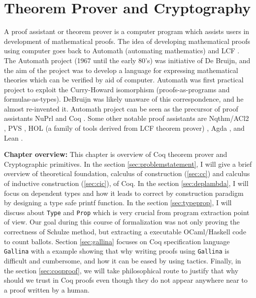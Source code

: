 \chapter{Theorem Prover and Cryptography}
\label{cha:theorem_crypto}
 

A proof assistant or theorem prover is a computer program which assists users in development 
of mathematical proofs. The idea of 
developing mathematical proofs using computer goes back to Automath (automating mathematics)
\citep{deBruijn1983} and LCF \citep{Milner:1972:IAS:942578.807067}. The 
Automath project (1967 until the early 80's)  was initiative of De Bruijn, and the aim of the project was to 
develop a language for expressing mathematical theories which can be verified by aid of computer.  
Automath was first 
practical project to exploit the Curry-Howard isomorphism (proofs-as-programs and formulas-as-types). 
DeBruijn  was likely unaware of this correspondence, and he almost re-invented it.
Automath project can be seen as the precursor of
 proof assistants NuPrl \citep{Constable:1986:IMN:10510} and Coq \citep{Bertot:2004:ITP}.  
 Some other notable  proof assistants are 
 Nqthm/ACl2 \citep{507872}, PVS \citep{Owre:1992:PPV:648230.752639},
 HOL (a family of tools derived from LCF theorem prover) \citep{Slind:2008:BOH:1459784.1459792}
 \citep{Harrison:1996:HLT:646184.682934} \citep{Nipkow:2002:IHP},
 Agda \citep{Norell:2008:DTP:1813347.1813352}, and Lean \citep{10.1007/978-3-319-21401-6_26}.


\textbf{Chapter overview:}
 This chapter is overview of Coq theorem prover and Cryptographic primitives. 
 In the section \ref{sec:problemstatement}, I will give a brief overview of 
 theoretical foundation, calculus of construction (\ref{sec:cc}) and calculus of inductive 
 construction (\ref{sec:cic}), of Coq. In the section \ref{sec:deplambda}, I will focus 
 on dependent types and  how it leads to correct by construction paradigm
 by designing a  type safe printf function. 
 In the section \ref{sec:typeprop}, I will discuss about \texttt{Type} and \texttt{Prop}
 which is very crucial from program extraction point of view.  Our goal during 
 this course of formalization was not only proving the correctness of 
 Schulze method, but extracting a executable OCaml/Haskell code to count 
 ballots. Section \ref{sec:gallina} focuses on Coq specification language 
 \texttt{Gallina} with a example showing that why writing proofs using  
 \texttt{Gallina} is difficult and cumbersome, and how it can be eased by 
 using tactics. Finally, in the section  \ref{sec:coqproof}, we will take 
 philosophical route to justify that why should we trust in Coq proofs 
 even though they do not appear anywhere near to a proof written by 
 a human. 


